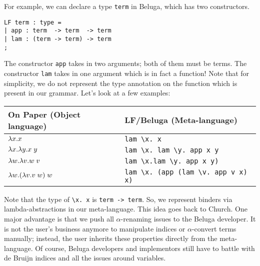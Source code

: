 For example, we can declare a type \lstinline!term! in Beluga,
which has two constructors.

\begin{lstlisting}
LF term : type =
| app : term  -> term  -> term
| lam : (term -> term) -> term
;
\end{lstlisting}

The constructor \lstinline!app! takes in two arguments; both of them
must be terms. The constructor \lstinline!lam! takes in one
argument which is in fact a function! Note that for simplicity, we do
not represent the type annotation on the function which is present in
our grammar.
%
Let's look at a few examples:
\begin{center}
\begin{tabular}{l@{\quad}|@{\quad}l}
  On Paper (Object language) & LF/Beluga (Meta-language)\\
  \hline
  $\lambda x.x$ & \lstinline!lam \x. x! \\
  $\lambda x.\lambda y. x \; y$ &
  \lstinline!lam \x. lam \y. app x y! \\
  $\lambda w.\lambda v. w \; v$ &
  \lstinline!lam \x.lam \y. app x y)! \\
  $\lambda w. (\lambda v. v \; w) \; w$
  & \lstinline!lam \x. (app (lam \v. app v x) x)!
\end{tabular}
\end{center}

Note that the type of \lstinline!\x. x! is \lstinline!term -> term!. So,
we represent binders  via lambda-abstractions in our
meta-language. This idea goes back to Church. One major advantage is
that we push all $\alpha$-renaming issues to the Beluga developer. It
is not the user's business anymore to manipulate indices or
$\alpha$-convert terms manually; instead, the user inherits these
properties directly from the meta-language. Of course, Beluga developers and
implementors still have to battle with de Bruijn indices and all the issues
around variables.

